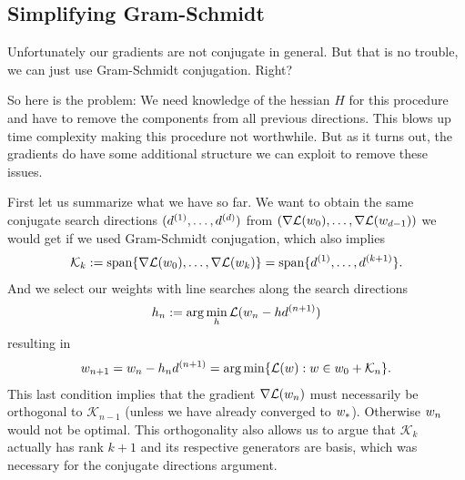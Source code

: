 \subsection{Simplifying Gram-Schmidt}

Unfortunately our gradients are not conjugate in general. But that is no
trouble, we can just use Gram-Schmidt conjugation. Right?

So here is the problem: We need knowledge of the hessian \(H\) for this
procedure and have to remove the components from all previous directions. This
blows up time complexity making this procedure not worthwhile. But as it turns
out, the gradients do have some additional structure we can exploit to remove
these issues.

First let us summarize what we have so far. We want to obtain the same conjugate
search directions \((d^{(1)},\dots,d^{(d)})\) from
\((\nabla\mathcal{L}(w_0),\dots,\nabla\mathcal{L}(w_{d-1}))\)
we would get if we used Gram-Schmidt conjugation, which also implies
\begin{align*}
	\mathcal{K}_k := \text{span}\{\nabla\mathcal{L}(w_0),\dots,\nabla\mathcal{L}(w_k)\}
	= \text{span}\{d^{(1)},\dots,d^{(k+1)}\}.
\end{align*}
And we select our weights with line searches along the search directions
\begin{align*}
	h_n := \arg\min_h \mathcal{L}(w_n - h d^{(n+1)})
\end{align*}
resulting in
\begin{align*}
	w_{n+1} = w_n - h_n d^{(n+1)}
	= \arg\min\{ \mathcal{L}(w) : w\in w_0 + \mathcal{K}_n\}.
\end{align*}
This last condition implies that the gradient \(\nabla\mathcal{L}(w_n)\)
must necessarily be orthogonal to \(\mathcal{K}_{n-1}\) (unless we have already
converged to \(w_*\)). Otherwise \(w_n\) would not be optimal. This
orthogonality also allows us to argue that \(\mathcal{K}_k\) actually has rank
\(k+1\) and its respective generators are basis, which was necessary for the
conjugate directions argument.


